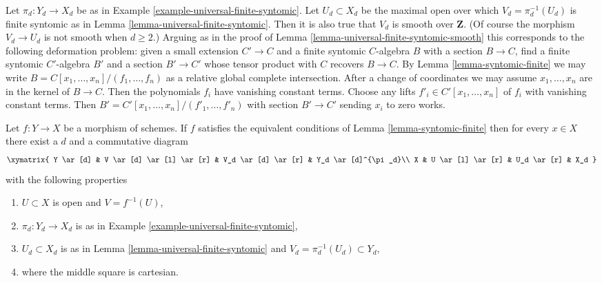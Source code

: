 \begin{remark}
\label{remark-universal-finite-syntomic-smooth-top}
Let $\pi_d : Y_d \to X_d$ be as in
Example \ref{example-universal-finite-syntomic}.
Let $U_d \subset X_d$ be the maximal open over which
$V_d = \pi_d^{-1}(U_d)$ is finite syntomic as in
Lemma \ref{lemma-universal-finite-syntomic}.
Then it is also true that $V_d$ is smooth over $\mathbf{Z}$.
(Of course the morphism $V_d \to U_d$ is not smooth when $d \geq 2$.)
Arguing as in the proof of Lemma \ref{lemma-universal-finite-syntomic-smooth}
this corresponds to the following deformation
problem: given a small extension $C' \to C$ and
a finite syntomic $C$-algebra $B$ with a section $B \to C$,
find a finite syntomic $C'$-algebra $B'$ and a section $B' \to C'$
whose tensor product with $C$ recovers $B \to C$.
By Lemma \ref{lemma-syntomic-finite} we may write
$B = C[x_1, \ldots, x_n]/(f_1, \ldots, f_n)$ as
a relative global complete intersection.
After a change of coordinates we may assume
$x_1, \ldots, x_n$ are in the kernel of $B \to C$.
Then the polynomials $f_i$ have vanishing constant terms.
Choose any lifts $f'_i \in C'[x_1, \ldots, x_n]$ of $f_i$
with vanishing constant terms. Then 
$B' = C'[x_1, \ldots, x_n]/(f'_1, \ldots, f'_n)$
with section $B' \to C'$ sending $x_i$ to zero works.
\end{remark}

\begin{lemma}
\label{lemma-locally-comes-from-universal-finite}
Let $f : Y \to X$ be a morphism of schemes. If $f$ satisfies the equivalent
conditions of Lemma \ref{lemma-syntomic-finite} then for every
$x \in X$ there exist a $d$ and a commutative diagram
$$
\xymatrix{
Y \ar[d] &
V \ar[d] \ar[l] \ar[r] &
V_d \ar[d] \ar[r] &
Y_d \ar[d]^{\pi_d}\\
X &
U \ar[l] \ar[r] &
U_d \ar[r] &
X_d
}
$$
with the following properties
\begin{enumerate}
\item $U \subset X$ is open and $V = f^{-1}(U)$,
\item $\pi_d : Y_d \to X_d$ is as in
Example \ref{example-universal-finite-syntomic},
\item $U_d \subset X_d$ is as in Lemma \ref{lemma-universal-finite-syntomic}
and $V_d = \pi_d^{-1}(U_d) \subset Y_d$,
\item where the middle square is cartesian.
\end{enumerate}
\end{lemma}

